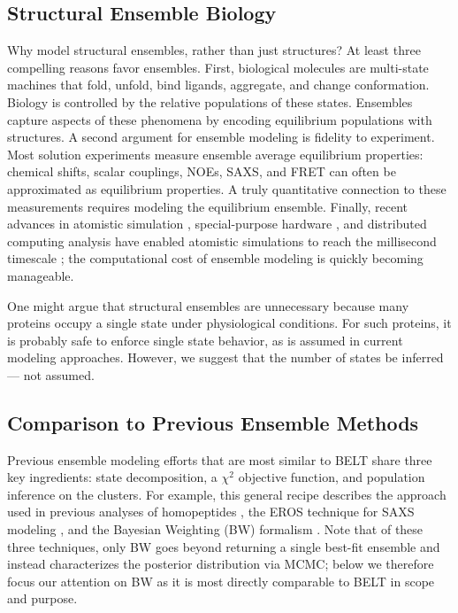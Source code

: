\documentclass[journal=jacsat,manuscript=article]{achemso}
\begin{document}
\subsection*{Structural Ensemble Biology}

Why model structural ensembles, rather than just structures?  At least three compelling reasons favor ensembles.  First, biological molecules are multi-state machines that fold, unfold, bind ligands, aggregate, and change conformation.  Biology is controlled by the relative populations of these states.  Ensembles capture aspects of these phenomena by encoding equilibrium populations with structures.  A second argument for ensemble modeling is fidelity to experiment.  Most solution experiments measure ensemble average equilibrium properties: chemical shifts, scalar couplings, NOEs, SAXS, and FRET can often be approximated as equilibrium properties.  A truly quantitative connection to these measurements requires modeling the equilibrium ensemble.  Finally, recent advances in atomistic simulation  \cite{hess2008, pronk2013gromacs, eastman2012openmm, eastman2010openmm}, special-purpose hardware  \cite{Shaw2008}, and distributed computing analysis  \cite{emma, msmb2} have enabled atomistic simulations to 
reach the millisecond timescale  \cite{voelz2010, bowman2011atomistic, shaw2010, Shaw2011}; the computational cost of ensemble modeling is quickly becoming manageable.

One might argue that structural ensembles are unnecessary because many proteins occupy a single state under physiological conditions.  For such proteins, it is probably safe to enforce single state behavior, as is assumed in current modeling approaches. However, we suggest that the number of states be inferred --- not assumed.  

\subsection*{Comparison to Previous Ensemble Methods}

Previous ensemble modeling efforts that are most similar to BELT share three key ingredients: state decomposition, a $\chi^2$ objective function, and population inference on the clusters.  For example, this general recipe describes the approach used in previous analyses of homopeptides  \cite{Graf2007}, the EROS technique for SAXS modeling  \cite{rozycki2011saxs}, and the Bayesian Weighting (BW) formalism  \cite{fisher2010, fisher2012efficient}.  Note that of these three techniques, only BW goes beyond returning a single best-fit ensemble and instead characterizes the posterior distribution via MCMC; below we therefore focus our attention on BW as it is most directly comparable to BELT in scope and purpose.
\end{document}
